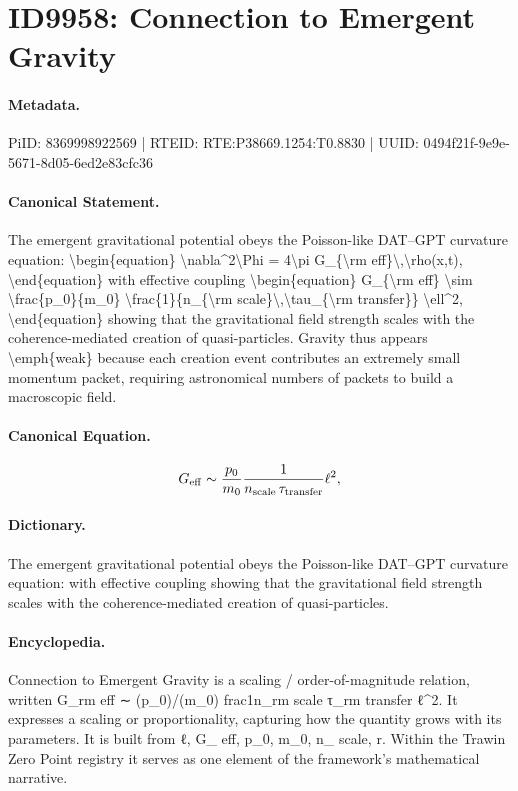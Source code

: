 \section*{ID9958: Connection to Emergent Gravity}
\paragraph{Metadata.}
PiID: 8369998922569 | RTEID: RTE:P38669.1254:T0.8830 | UUID: 0494f21f-9e9e-5671-8d05-6ed2e83cfc36

\paragraph{Canonical Statement.}
The emergent gravitational potential obeys the Poisson-like DAT–GPT curvature equation: \textbackslash{}begin\{equation\} \textbackslash{}nabla\textasciicircum{}2\textbackslash{}Phi = 4\textbackslash{}pi G\_\{\textbackslash{}rm eff\}\textbackslash{},\textbackslash{}rho(x,t), \textbackslash{}end\{equation\} with effective coupling \textbackslash{}begin\{equation\} G\_\{\textbackslash{}rm eff\} \textbackslash{}sim \textbackslash{}frac\{p\_0\}\{m\_0\} \textbackslash{}frac\{1\}\{n\_\{\textbackslash{}rm scale\}\textbackslash{},\textbackslash{}tau\_\{\textbackslash{}rm transfer\}\} \textbackslash{}ell\textasciicircum{}2, \textbackslash{}end\{equation\} showing that the gravitational field strength scales with the coherence-mediated creation of quasi-particles. Gravity thus appears \textbackslash{}emph\{weak\} because each creation event contributes an extremely small momentum packet, requiring astronomical numbers of packets to build a macroscopic field.

\paragraph{Canonical Equation.}
\[
G_{\rm eff} \sim \frac{p_0}{m_0} \frac{1}{n_{\rm scale}\,\tau_{\rm transfer}} \ell^2,
\]

\paragraph{Dictionary.}
The emergent gravitational potential obeys the Poisson-like DAT–GPT curvature equation: with effective coupling showing that the gravitational field strength scales with the coherence-mediated creation of quasi-particles.

\paragraph{Encyclopedia.}
Connection to Emergent Gravity is a scaling / order-of-magnitude relation, written G\_rm eff ∼ (p\_0)/(m\_0) frac1n\_rm scale τ\_rm transfer ℓ\textasciicircum{}2. It expresses a scaling or proportionality, capturing how the quantity grows with its parameters. It is built from ℓ, G\_ eff, p\_0, m\_0, n\_ scale, r. Within the Trawin Zero Point registry it serves as one element of the framework's mathematical narrative.
